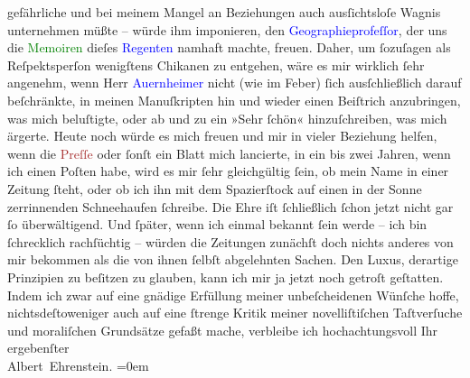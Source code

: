                     gefährliche und bei meinem Mangel an Beziehungen auch ausſichtsloſe Wagnis
                    unternehmen müßte – würde ihm imponieren, den \textcolor{blue}{Geographieprofeſſor}{}, der uns die \textcolor{green}{Memoiren}{} dieſes \textcolor{blue}{Regenten}{} namhaft machte, freuen. Daher,
                    um ſozuſagen als Reſpektsperſon wenigſtens Chikanen zu entgehen, wäre es mir
                    wirklich ſehr angenehm, wenn Herr \textcolor{blue}{Auernheimer}{}\ledrightnote{\textcolor{blue}{Raoul Auernheimer}} nicht (wie im Feber) ſich ausſchließlich
                    darauf beſchränkte, in meinen Manuſkripten hin und wieder einen Beiſtrich
                    anzubringen, was mich beluſtigte, oder ab und zu ein »Sehr ſchön«
                    hinzuſchreiben, was mich ärgerte. Heute noch würde es mich freuen und mir in
                    vieler Beziehung helfen, wenn die \textcolor{brown}{Preſſe}{}\ledrightnote{\textcolor{brown}{Neue Freie Presse}} oder
                    ſonſt ein Blatt mich lancierte, in ein bis zwei Jahren, wenn ich einen Poſten
                    habe, wird es mir ſehr gleichgültig ſein, ob mein Name in einer Zeitung ſteht,
                    oder ob ich ihn mit dem Spazierſtock auf einen in der Sonne zerrinnenden
                    Schneehaufen ſchreibe. {\pb}Die Ehre iſt
                    ſchließlich ſchon jetzt nicht gar ſo überwältigend. Und ſpäter, wenn ich einmal
                    bekannt ſein werde – ich bin ſchrecklich rachſüchtig – würden die Zeitungen
                    zunächſt doch nichts anderes von mir bekommen als die von ihnen ſelbſt
                    abgelehnten Sachen. Den Luxus, derartige Prinzipien \introOben{}zu\introOben{}
                    beſitzen zu glauben, kann ich mir ja jetzt noch getroſt geſtatten.\pend
           \pstart
           Indem ich zwar auf eine gnädige Erfüllung meiner \introOben{}unbeſcheidenen\introOben{} Wünſche hoffe, nichtsdeſtoweniger auch auf eine
                    ſtrenge Kritik meiner novelliſtiſchen Taſtverſuche und moraliſchen Grundsätze
                    gefaßt mache, verbleibe ich hochachtungsvoll\pend
           \pstart
           Ihr ergebenſter{\\[\baselineskip]}\spacefill\mbox{Albert Ehrenstein.}\pend
           \leftskip=0em{}\endnumbering{}  
      